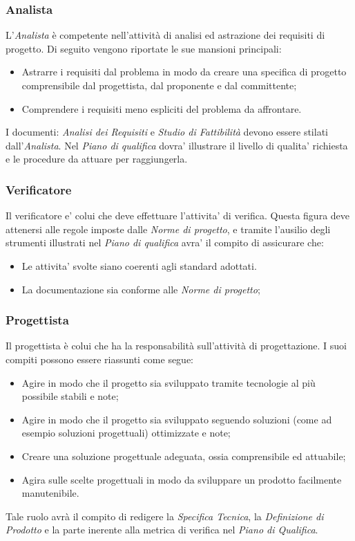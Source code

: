 \subsubsection{Analista}
L'\textit{Analista} è competente nell'attività di analisi ed astrazione dei requisiti di progetto.
Di seguito vengono riportate le sue mansioni principali:
\begin{itemize}
\item Astrarre i requisiti dal problema in modo da creare una specifica di progetto comprensibile dal progettista, dal proponente e dal committente;
\item Comprendere i requisiti meno espliciti del problema da affrontare.
\end{itemize}

I documenti: \textit{Analisi dei Requisiti} e \textit{Studio di Fattibilità} devono essere stilati dall'\textit{Analista}.
Nel \textit{Piano di qualifica} dovra' illustrare il livello di qualita' richiesta e le procedure da attuare per raggiungerla.

\subsubsection{Verificatore}
Il verificatore e' colui che deve effettuare l'attivita' di verifica. Questa figura deve attenersi alle regole imposte dalle \textit{Norme di progetto}, e tramite l'ausilio degli strumenti illustrati nel \textit{Piano di qualifica} avra' il compito di assicurare che:
\begin{itemize}
\item Le attivita' svolte siano coerenti agli standard adottati.
\item La documentazione sia conforme alle \textit{Norme di progetto};
\end{itemize}

\subsubsection{Progettista}
Il progettista è colui che ha la responsabilità sull'attività di progettazione. I suoi compiti possono essere riassunti come segue:
\begin{itemize}
\item Agire in modo che il progetto sia sviluppato tramite tecnologie al più possibile stabili e note;
\item Agire in modo che il progetto sia sviluppato seguendo soluzioni (come ad esempio soluzioni progettuali) ottimizzate e note;
\item Creare una soluzione progettuale adeguata, ossia comprensibile ed attuabile;
\item Agira sulle scelte progettuali in modo da sviluppare un prodotto facilmente manutenibile.
\end{itemize}
Tale ruolo avrà il compito di redigere la \textit{Specifica Tecnica}, la \textit{Definizione di Prodotto} e la parte inerente alla metrica di verifica nel \textit{Piano di Qualifica}.
